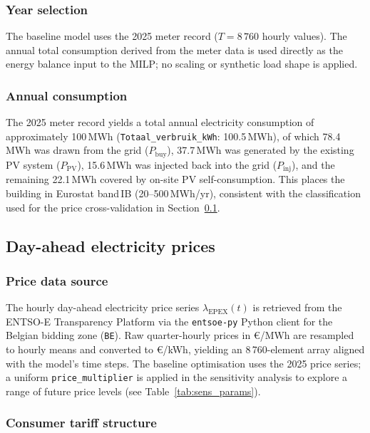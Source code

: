 \documentclass[11pt,a4paper]{report}
\begin{document}
\subsubsection{Year selection}

The baseline model uses the 2025 meter record ($T = 8\,760$ hourly values).
The annual total consumption derived from the meter data is used directly as the
energy balance input to the MILP; no scaling or synthetic load shape is applied.

\subsubsection{Annual consumption}

The 2025 meter record yields a total annual electricity consumption of
approximately 100\,MWh (\texttt{Totaal\_verbruik\_kWh}: 100.5\,MWh), of which
78.4\,MWh was drawn from the grid ($P_\mathrm{buy}$), 37.7\,MWh was generated
by the existing PV system ($P_\mathrm{PV}$), 15.6\,MWh was injected back into
the grid ($P_\mathrm{inj}$), and the remaining 22.1\,MWh covered by on-site
PV self-consumption.
This places the building in Eurostat band\,IB (20--500\,MWh/yr), consistent with
the classification used for the price cross-validation in
Section~\ref{subsec:price_data}.

\subsection{Day-ahead electricity prices}
\label{subsec:price_data}

\subsubsection{Price data source}

The hourly day-ahead electricity price series $\lambda_\mathrm{EPEX}(t)$ is retrieved from the
ENTSO-E Transparency Platform via the \texttt{entsoe-py} Python client \cite{entsoe-py}
for the Belgian bidding zone (\texttt{BE}).
Raw quarter-hourly prices in \euro/MWh are resampled to hourly means and converted to
\euro/kWh, yielding an 8\,760-element array aligned with the model's time steps.
The baseline optimisation uses the 2025 price series; a uniform \texttt{price\_multiplier}
is applied in the sensitivity analysis to explore a range of future price levels
(see Table~\ref{tab:sens_params}).

\subsubsection{Consumer tariff structure}
\end{document}
